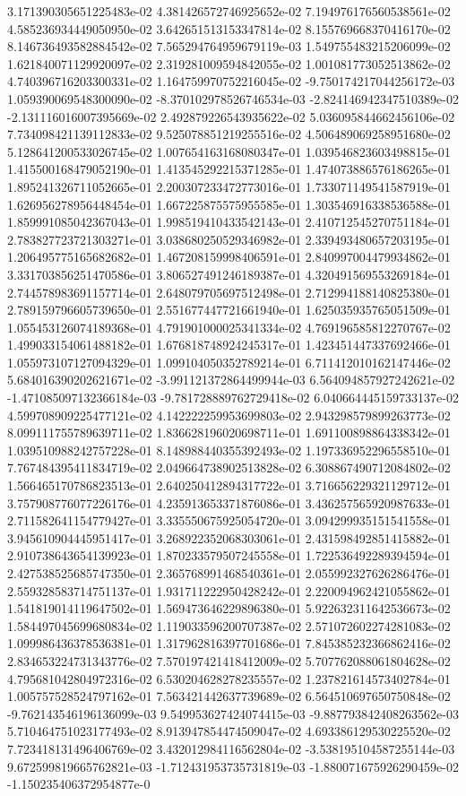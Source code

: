 3.171390305651225483e-02	4.381426572746925652e-02	7.194976176560538561e-02	4.585236934449050950e-02	3.642651513153347814e-02	8.155769668370416170e-02	8.146736493582884542e-02	7.565294764959679119e-03	1.549755483215206099e-02	1.621840071129920097e-02	2.319281009594842055e-02	1.001081773052513862e-02	4.740396716203300331e-02	1.164759970752216045e-02	-9.750174217044256172e-03	1.059390069548300090e-02	-8.370102978526746534e-03	-2.824146942347510389e-02	-2.131116016007395669e-02	2.492879226543935622e-02	5.036095844662456106e-02	7.734098421139112833e-02	9.525078851219255516e-02	4.506489069258951680e-02	5.128641200533026745e-02	1.007654163168080347e-01	1.039546823603498815e-01	1.415500168479052190e-01	1.413545292215371285e-01	1.474073886576186265e-01	1.895241326711052665e-01	2.200307233472773016e-01	1.733071149541587919e-01	1.626956278956448454e-01	1.667225875575955585e-01	1.303546916338536588e-01	1.859991085042367043e-01	1.998519410433542143e-01	2.410712545270751184e-01	2.783827723721303271e-01	3.038680250529346982e-01	2.339493480657203195e-01	1.206495775165682682e-01	1.467208159998406591e-01	2.840997004479934862e-01	3.331703856251470586e-01	3.806527491246189387e-01	4.320491569553269184e-01	2.744578983691157714e-01	2.648079705697512498e-01	2.712994188140825380e-01	2.789159796605739650e-01	2.551677447721661940e-01	1.625035935765051509e-01	1.055453126074189368e-01	4.791901000025341334e-02	4.769196585812270767e-02	1.499033154061488182e-01	1.676818748924245317e-01	1.423451447337692466e-01	1.055973107127094329e-01	1.099104050352789214e-01	6.711412010162147446e-02	5.684016390202621671e-02	-3.991121372864499944e-03	6.564094857927242621e-02	-1.471085097132366184e-03	-9.781728889762729418e-02	6.040664445159733137e-02	4.599708909225477121e-02	4.142222259953699803e-02	2.943298579899263773e-02	8.099111755789639711e-02	1.836628196020698711e-01	1.691100898864338342e-01	1.039510988242757228e-01	8.148988440355392493e-02	1.197336952296558510e-01	7.767484395411834719e-02	2.049664738902513828e-02	6.308867490712084802e-02	1.566465170786823513e-01	2.640250412894317722e-01	3.716656229321129712e-01	3.757908776077226176e-01	4.235913653371876086e-01	3.436257565920987633e-01	2.711582641154779427e-01	3.335550675925054720e-01	3.094299935151541558e-01	3.945610904445951417e-01	3.268922352068303061e-01	2.431598492851415882e-01	2.910738643654139923e-01	1.870233579507245558e-01	1.722536492289394594e-01	2.427538525685747350e-01	2.365768991468540361e-01	2.055992327626286476e-01	2.559328583714751137e-01	1.931711222950428242e-01	2.220094962421055862e-01	1.541819014119647502e-01	1.569473646229896380e-01	5.922632311642536673e-02	1.584497045699680834e-02	1.119033596200707387e-02	2.571072602274281083e-02	1.099986436378536381e-01	1.317962816397701686e-01	7.845385232366862416e-02	2.834653224731343776e-02	7.570197421418412009e-02	5.707762088061804628e-02	4.795681042804972316e-02	6.530204628278235557e-02	1.237821614573402784e-01	1.005757528524797162e-01	7.563421442637739689e-02	6.564510697650750848e-02	-9.762143546196136099e-03	9.549953627424074415e-03	-9.887793842408263562e-03	5.710464751023177493e-02	8.913947854474509047e-02	4.693386129530225520e-02	7.723418131496406769e-02	3.432012984116562804e-02	-3.538195104587255144e-03	9.672599819665762821e-03	-1.712431953735731819e-03	-1.880071675926290459e-02	-1.150235406372954877e-0
